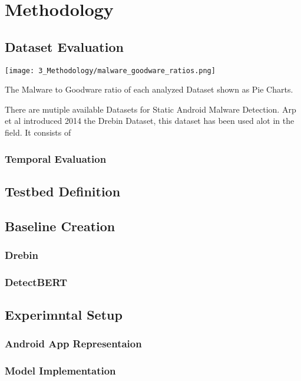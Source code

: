\chapter{Methodology} %

\label{Methodology} %




\section{Dataset Evaluation}


\begin{marginfigure}[-5\baselineskip] %
    \texttt{[image: 3\_Methodology/malware\_goodware\_ratios.png]}
    \caption{\label{fig:marfig}The Malware to Goodware ratio of each analyzed Dataset shown as Pie Charts.}
\end{marginfigure}

There are mutiple available Datasets for Static Android Malware Detection.
Arp et al introduced 2014 the Drebin Dataset, this dataset has been used alot in the field. It consists of 

\subsection{Temporal Evaluation}

\section{Testbed Definition}

\section{Baseline Creation}

\subsection{Drebin}

\subsection{DetectBERT}

\section{Experimntal Setup}

\subsection{Android App Representaion}

\subsection{Model Implementation}

